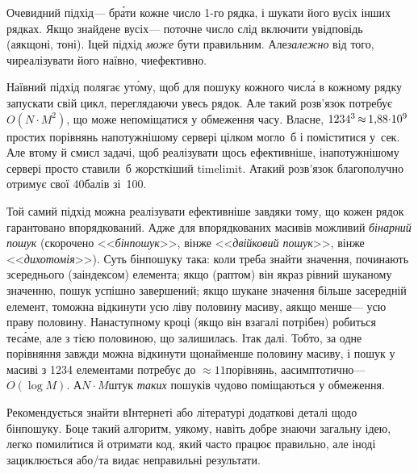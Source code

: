 \Tutorial	
Очевидний підхід\nolinebreak[3] --- бр\'{а}ти кожне число \mbox{1-го} рядка, і шукати його в\nolinebreak[3] усіх інших рядках. Якщо знайдене в\nolinebreak[3] усіх\nolinebreak[3] --- поточне число слід включити у\nolinebreak[3] відповідь (а\nolinebreak[3] якщо\nolinebreak[2] ні, то\nolinebreak[3] ні).
І\nolinebreak[3] цей підхід \emph{може} бути правильним. Але\nolinebreak[2] \emph{залежно} від того, чи\nolinebreak[3] реалізувати його наївно, чи\nolinebreak[3] ефективно. 

Наївний підхід полягає у\nolinebreak[3] т\'{о}му, щоб для пошуку кожного числ\'{а} в кожному рядку запускати свій цикл, переглядаючи увесь рядок. Але такий розв'язок потребує $O(N{\cdot}M^2)$, що може не\nolinebreak[3] поміщатися у обмеження часу. Власне, $1234^3\dib{{\approx}}{1{,}88{\cdot}10^9}$ простих порівнянь на\nolinebreak[2] потужнішому сервері цілком могло~б і поміститися у~сек. Але в\nolinebreak[3] тому й смисл задачі, щоб реалізувати щось ефективніше, і\nolinebreak[3] на\nolinebreak[3] потужнішому сервері просто ставили~б жорсткіший time\nolinebreak[2] limit. А\nolinebreak[3] такий розв'язок благополучно отримує свої 40\nolinebreak[3] балів зі~100. 

Той самий підхід можна реалізувати ефективніше завдяки тому, що кожен рядок гарантовано впорядкований. Адже для впорядкованих масивів можливий \emph{бінарний пошук} (скорочено <<\emph{бінпошук}>>, він\nolinebreak[3] же <<\emph{двійковий пошук}>>, він\nolinebreak[3] же <<\emph{дихотомія}>>). Суть бінпошуку така: коли треба знайти значення, починають з\nolinebreak[3] середнього (за\nolinebreak[3] індексом) елемента; якщо (раптом) він якраз рівний шуканому значенню, пошук успішно завершений; якщо шукане значення більше за\nolinebreak[3] середній елемент, то\nolinebreak[3] можна відкинути усю ліву половину масиву, а\nolinebreak[3] якщо менше\nolinebreak[3] --- усю праву половину. На\nolinebreak[3] наступному кроці (якщо він взагалі потрібен) робиться те\nolinebreak[3] с\'{а}ме, але з тією половиною, що залишилась. І\nolinebreak[3] так далі. Тобто, за одне порівняння завжди можна відкинути щонайменше половину масиву, і пошук у масиві з 1234 елементами потребує до ${\approx}11$\nolinebreak[3] порівнянь, а\nolinebreak[3] асимптотично\nolinebreak[3] --- $O(\log{}M)$. А\nolinebreak[3] $N{\cdot}M$\nolinebreak[2] штук \emph{таких} пошуків чудово поміщаються у обмеження. 

Рекомендується знайти в\nolinebreak[3] Інтернеті або літературі додаткові деталі щодо бін\-пошуку. Бо\nolinebreak[3] це такий алгоритм, у\nolinebreak[3] якому, навіть добре знаючи загальну ідею, легко помил\'{и}тися й отримати код, який часто працює правильно, але іноді зациклюється або/та видає неправильні результати. 

